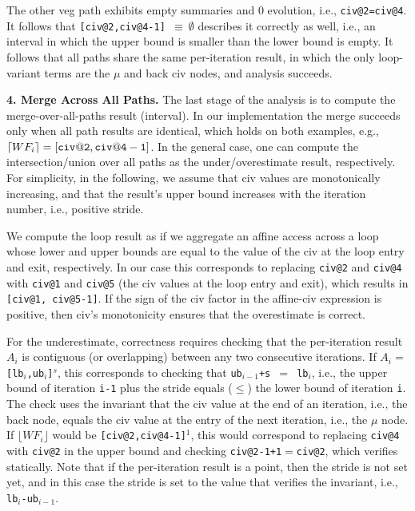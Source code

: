 \documentclass[10pt,nocopyrightspace]{sigplanconf}
\begin{document}
The other {\sc veg} path exhibits empty summaries and $0$ evolution,
i.e., {\tt civ@2=civ@4}. 
It follows that {\tt [civ@2,civ@4-1] $\equiv \ \emptyset$}  
describes it correctly as well, i.e., an interval in which the upper bound 
is smaller than the lower bound is empty.
  It follows that all paths share the same per-iteration result, 
in which the only loop-variant terms are the $\mu$ and back {\sc civ} nodes, 
and analysis succeeds.

\vspace{1ex}

{\bf 4. Merge Across All Paths.} 
%
The last stage of the analysis is to compute the merge-over-all-paths result (interval).
In our implementation the merge succeeds only when all path results are 
identical, which holds on both examples, e.g., $\lceil WF_i \rceil = {\tt [civ@2,civ@4-1]}$.
In the general case, one can compute the intersection/union over all paths as the  
under/overestimate result, respectively.
For simplicity, in the following, we assume that {\sc civ} values are monotonically 
increasing, and that the result's upper bound increases with the iteration number,
i.e., positive stride. 


We compute the loop result as if we aggregate an affine access
across a loop whose lower and upper bounds are equal to the value of the 
{\sc civ} at the loop entry and exit, respectively.  
%
In our case this corresponds to replacing {\tt civ@2} and {\tt civ@4} 
with {\tt civ@1} and {\tt civ@5} (the {\sc civ} values at the loop entry 
and exit), which results in
{\tt [civ@1, civ@5-1]}.   If the sign of the {\sc civ} factor in
the affine-{\sc civ} expression is positive, then {\sc civ}'s
monotonicity ensures that the overestimate is correct. 

For the underestimate, correctness requires checking that the
per-iteration result $A_i$ is contiguous (or overlapping) 
between any two consecutive iterations. If $A_i=${\tt[lb$_i$,ub$_i$]$^s$},
this corresponds to checking that {\tt ub$_{i-1}$+s $=$ lb$_i$},
i.e., the upper bound of iteration {\tt i-1} plus the stride equals ($\leq$) 
the lower bound of iteration {\tt i}.
%
The check uses the invariant that the {\sc civ} value  
at the end of an iteration, i.e., the back node, equals 
the {\sc civ} value at the entry of the next iteration,
i.e., the $\mu$ node.
%
If $\lfloor WF_i \rfloor$ would be {\tt [{\tt civ@2},{\tt civ@4}-1]$^1$},
this would correspond to replacing {\tt civ@4} with {\tt civ@2} in the upper 
bound and checking {\tt civ@2-1+1$=$civ@2}, which verifies statically. 
%
Note that if the per-iteration result is a point, then the stride is 
not set yet, and in this case the stride is set to the value that 
verifies the invariant, i.e., {\tt lb$_i$-ub$_{i-1}$}.
\end{document}

